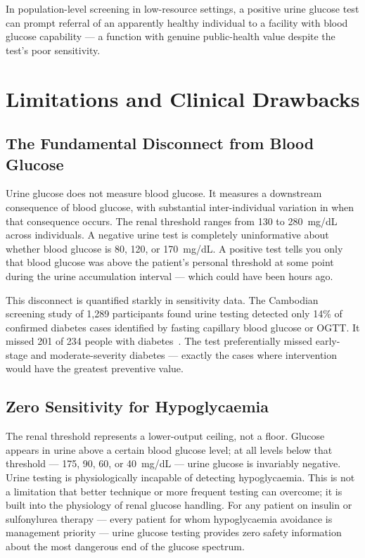 In population-level screening in low-resource settings, a positive urine glucose test can prompt referral of an apparently healthy individual to a facility with blood glucose capability --- a function with genuine public-health value despite the test's poor sensitivity.

\section{Limitations and Clinical Drawbacks}

\subsection*{The Fundamental Disconnect from Blood Glucose}

Urine glucose does not measure blood glucose. It measures a downstream consequence of blood glucose, with substantial inter-individual variation in when that consequence occurs. The renal threshold ranges from 130 to 280~mg/dL across individuals. A negative urine test is completely uninformative about whether blood glucose is 80, 120, or 170~mg/dL. A positive test tells you only that blood glucose was above the patient's personal threshold at some point during the urine accumulation interval --- which could have been hours ago.

This disconnect is quantified starkly in sensitivity data. The Cambodian screening study of 1,289 participants found urine testing detected only 14\% of confirmed diabetes cases identified by fasting capillary blood glucose or OGTT. It missed 201 of 234 people with diabetes~\cite{cambodia2018}. The test preferentially missed early-stage and moderate-severity diabetes --- exactly the cases where intervention would have the greatest preventive value.

\subsection*{Zero Sensitivity for Hypoglycaemia}

The renal threshold represents a lower-output ceiling, not a floor. Glucose appears in urine above a certain blood glucose level; at all levels below that threshold --- 175, 90, 60, or 40~mg/dL --- urine glucose is invariably negative. Urine testing is physiologically incapable of detecting hypoglycaemia. This is not a limitation that better technique or more frequent testing can overcome; it is built into the physiology of renal glucose handling. For any patient on insulin or sulfonylurea therapy --- every patient for whom hypoglycaemia avoidance is management priority --- urine glucose testing provides zero safety information about the most dangerous end of the glucose spectrum.

